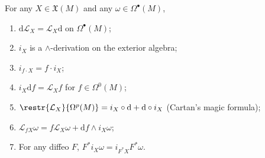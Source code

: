 \documentclass[english,letterpaper]{article}%
\numberwithin{equation}{section}
\numberwithin{figure}{section}
\numberwithin{table}{section}
\theoremstyle{definition}
\theoremstyle{definition}
\theoremstyle{definition}
\theoremstyle{plain}
\theoremstyle{plain}
\theoremstyle{plain}
\theoremstyle{plain}
\theoremstyle{remark}
\theoremstyle{remark}
\newcommand{\dd}{{\mathrm{d}}}
\newcommand{\Lie}{\mathcal{L}}
\newcommand{\fX}{\mathfrak{X}}
\begin{document}
\begin{prop} For any $X\in\fX(M)$ and any $\omega\in\Omega^\bullet(M)$,
\begin{enumerate}
    \item $\dd\Lie_X=\Lie_X\dd$ on $\Omega^\bullet(M)$;
    \item $i_X$ is a $\wedge$-derivation on the exterior algebra;
    \item $i_{f\cdot X}=f\cdot i_X$;
    \item $i_X\dd f=\Lie_X f$ for $f\in \Omega^0(M)$;
    \item $\restr{\Lie_X}{\Omega^p(M)}=i_X\circ\dd+\dd\circ i_X$ (Cartan's magic formula);
    \item $\Lie_{fX}\omega=f\Lie_X\omega +\dd f\wedge i_X\omega$;
    \item For any diffeo $F$, $F^\ast i_X\omega =i_{F^\ast X}F^\ast\omega$.
\end{enumerate}
\end{prop}
\end{document}
